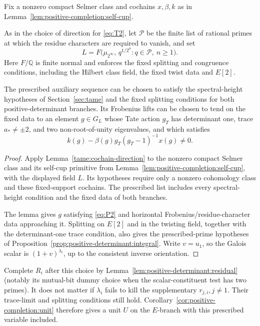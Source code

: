 Fix a nonzero compact Selmer class and cochains \(x,\beta,k\) as in
Lemma~\ref{lem:positive-completion:self-cup}.

As in the choice of direction for \eqref{eq:T2}, let \(\mathcal P\) be the
finite list of rational primes at which the residue characters are required
to vanish, and set
\[
 L=F\bigl(\mu_{2^\infty},\,q^{1/2^n}:q\in\mathcal P,\ n\ge1\bigr).
\]
Here \(F/\mathbb Q\) is finite normal and enforces the fixed splitting and
congruence conditions, including the Hilbert class field, the fixed twist
data and \(E[2]\).

\begin{lemma}\label{lem:positive-completion:direction}
The prescribed auxiliary sequence can be chosen to satisfy the
spectral-height hypotheses of Section~\ref{sec:tame} and the fixed splitting
conditions for both positive-determinant branches. Its Frobenius lifts can
be chosen to tend on the fixed data to an element \(g\in G_L\) whose
Tate action \(g_T\) has determinant one, trace \(a_*\ne\pm2\), and two
non-root-of-unity eigenvalues, and which satisfies
\[
                   k(g)-\beta(g)g_T(g_T-1)^{-1}x(g)\ne0.             \tag{P2}\label{eq:P2}
\]
\end{lemma}
\begin{proof}
Apply Lemma~\ref{tame:cochain-direction} to the nonzero compact
Selmer class and its self-cup primitive from
Lemma~\ref{lem:positive-completion:self-cup}, with the displayed field
\(L\). Its hypotheses require only a nonzero cohomology class and
these fixed-support cochains. The prescribed list includes every
spectral-height condition and the fixed data of both branches.

The lemma gives \(g\) satisfying \eqref{eq:P2} and horizontal
Frobenius/residue-character data approaching it. Splitting on \(E[2]\)
and in the twisting field, together with the determinant-one trace
condition, also gives the prescribed-prime hypotheses of
Proposition~\ref{prop:positive-determinant:integral}. Write \(v=u_1\),
so the Galois scalar is \((1+v)^{\lambda_i}\), up to the consistent
inverse orientation.
\end{proof}

Complete \(R_i\) after this choice by Lemma~\ref{lem:positive-determinant:residual} (notably its mutual-bit dummy choice when the scalar-constituent test has two primes). It does not matter if \(\lambda_i\) fails to kill the supplementary \(r_{j,i}, j\ne1\). Their trace-limit and splitting conditions still hold. Corollary~\ref{cor:positive-completion:unit} therefore gives a unit \(U\)
on the \(E\)-branch with this prescribed variable included.

